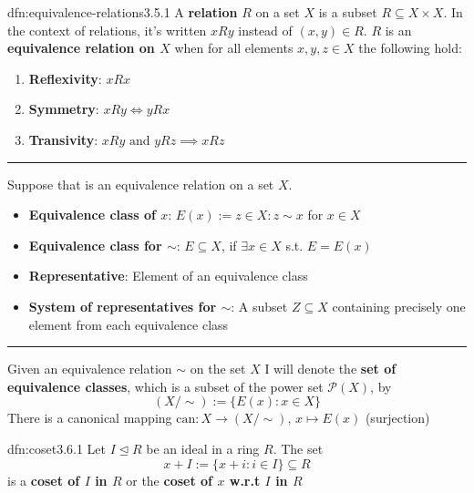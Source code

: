 \documentclass[landscape, 8pt]{extarticle}
\begin{document}
\begin{multicols}{3}
\begin{dfn}{dfn:equivalence-relations}{3.5.1}
    \vspace{-5pt}
    A \textbf{relation} $R$ on a set $X$ is a subset $R \subseteq X \times X $. In the context of relations, it's written $xRy$ instead of $(x,y)\in R$. $R$ is an \textbf{equivalence relation on $X$} when for all elements $x, y, z\in X$ the following hold:
    \begin{enumerate}
        \setlength\itemsep{0em}
        \item \textbf{Reflexivity}: $xRx$
        \item \textbf{Symmetry}: $xRy \iff yRx$
        \item \textbf{Transivity}: $xRy \text{ and } yRz \implies xRz$
    \end{enumerate}

    \vspace{-5pt}
    \noindent\rule{\textwidth}{0.2pt}

    Suppose that  is an equivalence relation on a set $X$.

    \vspace{-5pt}
    \begin{itemize}[leftmargin=*]
        \setlength\itemsep{0em}
        \item \textbf{Equivalence class of $x$}: $E(x) := z\in X : z \sim x$ for $x\in X$
        \item \textbf{Equivalence class for $\sim$}: $E\subseteq X$, if $\exists x\in X$ s.t. $E = E(x)$
        \item \textbf{Representative}: Element of an equivalence class
        \item \textbf{System of representatives for $\sim$}: A subset $Z \subseteq X$ containing precisely one element from each equivalence class
    \end{itemize}

    \vspace{-5pt}
    \noindent\rule{\textwidth}{0.2pt}

    Given an equivalence relation $\sim$ on the set $X$ I will denote the \textbf{set of equivalence classes}, which is a subset of the power set $\mathcal{P}(X)$, by
    \[(X / \sim) := \{E(x) : x\in X\}\]
    There is a canonical mapping $\text{can}: X \to (X / \sim),\, x\mapsto E(x)$ (surjection)
\end{dfn}

\vspace{-5pt}
\begin{dfn}[Coset]{dfn:coset}{3.6.1}
    \vspace{-5pt}
    Let $I \unlhd R$ be an ideal in a ring $R$. The set
    \[ x + I := \{x + i : i\in I\} \subseteq R\]
    is a \textbf{coset of $I$ in $R$} or the \textbf{coset of $x$ w.r.t $I$ in $R$}


\end{dfn}
\end{multicols}
\end{document}
